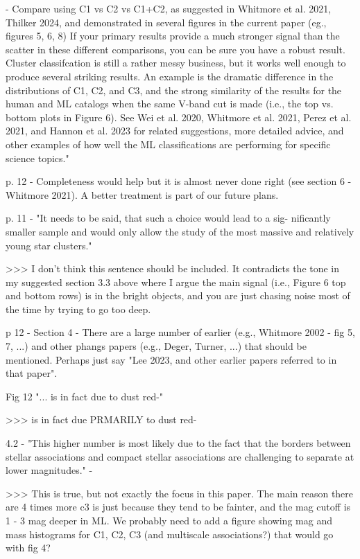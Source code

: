- Compare using C1 vs C2 vs C1+C2, as suggested in Whitmore et al. 2021, Thilker 2024, and demonstrated in several figures in the current paper (eg., figures 5, 6, 8)
If your primary results provide a much stronger signal than the scatter in these different comparisons, you can be sure you have a robust result.
 Cluster classifcation is still a rather messy business, but it works well enough to produce several striking results. An example is the dramatic difference in the distributions of C1, C2, and C3, and the strong similarity of the results for the human and ML catalogs when the same V-band cut is made (i.e., the top vs.  bottom plots in Figure 6).
See Wei et al. 2020, Whitmore et al. 2021, Perez et al. 2021, and Hannon et al. 2023 for related suggestions, more detailed advice, and other examples of how well the ML classifications are performing for specific science topics."
 
 
 
p. 12 - Completeness would help  but it is almost never done right (see section 6 - Whitmore 2021). A better treatment is  part of our future plans. 
 
 
p. 11 - "It needs to be said, that such a choice would lead to a sig-
nificantly smaller sample and would only allow the study of
the most massive and relatively young star clusters."
 
>>> I don't think this sentence should be included. It contradicts the tone in my suggested section  3.3 above where I argue the main signal (i.e., Figure 6 top and bottom rows)  is in the bright objects, and you are just chasing noise most of the time by trying to go too deep.
 
 
p 12 - Section 4 - There are a large number of earlier (e.g., Whitmore 2002 - fig 5, 7, ...) and other phangs papers (e.g., Deger, Turner, ...) that should be mentioned. Perhaps just say "Lee 2023, and other earlier papers referred to in that paper". 
 
 
Fig 12  "... is in fact due to dust red-" 
 
>>> is in fact due PRMARILY to dust red-
 
 
4.2 - "This higher number is most likely due to the fact that the borders between stellar associations and compact stellar associations are challenging to separate at lower magnitudes." -
 
>>> This is true, but not exactly the focus in this paper. The main reason there are 4 times more c3  is just because they tend to be fainter, and the mag cutoff is 1 - 3 mag deeper in ML. We probably need to add a figure showing mag and mass histograms for C1, C2, C3 (and multiscale associations?) that would go with fig 4?
 
